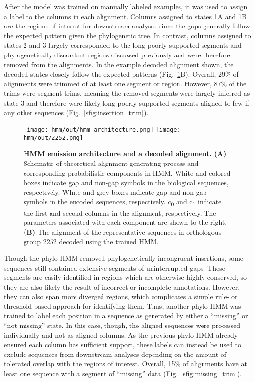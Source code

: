 After the model was trained on manually labeled examples, it was used to assign a label to the columns in each alignment. Columns assigned to states 1A and 1B are the regions of interest for downstream analyses since the gaps generally follow the expected pattern given the phylogenetic tree. In contrast, columns assigned to states 2 and 3 largely corresponded to the long poorly supported segments and phylogenetically discordant regions discussed previously and were therefore removed from the alignments. In the example decoded alignment shown, the decoded states closely follow the expected patterns (Fig.~\ref{fig:hmm}B). Overall, 29\% of alignments were trimmed of at least one segment or region. However, 87\% of the trims were segment trims, meaning the removed segments were largely inferred as state 3 and therefore were likely long poorly supported segments aligned to few if any other sequences (Fig.~\ref{sfig:insertion_trim}).

\begin{figure}[h!]
\texttt{[image: hmm/out/hmm\_architecture.png]}
\texttt{[image: hmm/out/2252.png]}
\centering
\caption{\textbf{HMM emission architecture and a decoded alignment.}
\textbf{(A)} Schematic of theoretical alignment generating process and corresponding probabilistic components in HMM. White and colored boxes indicate gap and non-gap symbols in the biological sequences, respectively. White and grey boxes indicate gap and non-gap symbols in the encoded sequences, respectively. c\textsubscript{0} and c\textsubscript{1} indicate the first and second columns in the alignment, respectively. The parameters associated with each component are shown to the right. \textbf{(B)} The alignment of the representative sequences in orthologous group 2252 decoded using the trained HMM.}
\label{fig:hmm}
\end{figure}

Though the phylo-HMM removed phylogenetically incongruent insertions, some sequences still contained extensive segments of uninterrupted gaps. These segments are easily identified in regions which are otherwise highly conserved, so they are also likely the result of incorrect or incomplete annotations. However, they can also span more diverged regions, which complicates a simple rule- or threshold-based approach for identifying them. Thus, another phylo-HMM was trained to label each position in a sequence as generated by either a ``missing'' or ``not missing'' state. In this case, though, the aligned sequences were processed individually and not as aligned columns. As the previous phylo-HMM already ensured each column has sufficient support, these labels can instead be used to exclude sequences from downstream analyses depending on the amount of tolerated overlap with the regions of interest. Overall, 15\% of alignments have at least one sequence with a segment of ``missing'' data (Fig.~\ref{sfig:missing_trim}).


